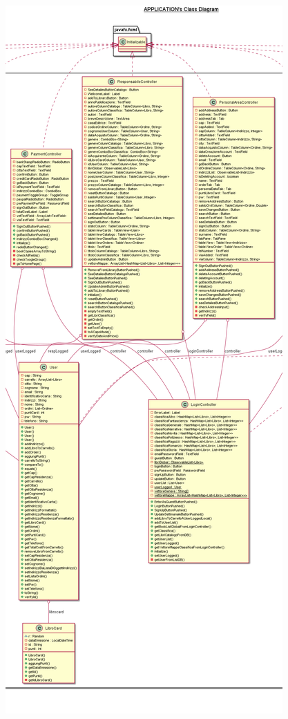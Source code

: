 \documentclass[a4paper,12pt,titlepage]{article}
\begin{document}
{{{\begin{figure}[H]
		\includegraphics[scale=0.21]{classDiagramParte2}
\end{figure}
\begin{figure}[H]
		\centering

\end{figure}}}}
\end{document}
